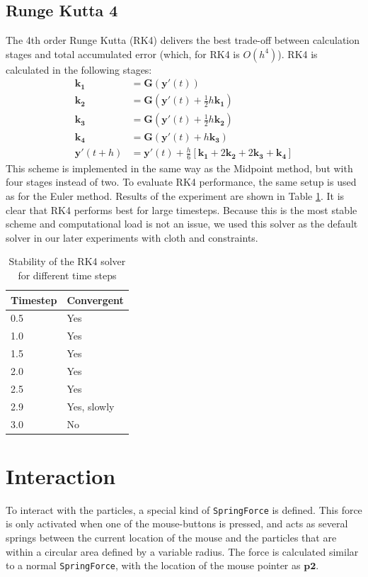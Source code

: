 \documentclass[a4paper,twoside,11pt,twocolumn]{article}
\begin{document}
\subsection{Runge Kutta 4}
The 4th order Runge Kutta (RK4) delivers the best trade-off between calculation stages and total accumulated error (which, for RK4 is $O(h^4)$). RK4 is calculated in the following stages:
\begin{align}
	\mathbf{k_1} &= \mathbf{G}(\mathbf{y}'(t))\\
	\mathbf{k_2} &= \mathbf{G}(\mathbf{y}'(t)+\frac{1}{2}h\mathbf{k_1})\\
	\mathbf{k_3} &= \mathbf{G}(\mathbf{y}'(t)+\frac{1}{2}h\mathbf{k_2})\\
	\mathbf{k_4} &= \mathbf{G}(\mathbf{y}'(t)+h\mathbf{k_3})\\
	\mathbf{y}'(t+h) &= \mathbf{y}'(t) + \frac{h}{6}[\mathbf{k_1}+2\mathbf{k_2}+2\mathbf{k_3}+\mathbf{k_4}]
\end{align}
This scheme is implemented in the same way as the Midpoint method, but with four stages instead of two.
To evaluate RK4 performance, the same setup is used as for the Euler method. Results of the experiment are shown in Table \ref{RK4}. It is clear that RK4 performs best for large timesteps. Because this is the most stable scheme and computational load is not an issue, we used this solver as the default solver in our later experiments with cloth and constraints.
\begin{table}[h]
	\caption{Stability of the RK4 solver for different time steps}
	\label{RK4}
	\begin{tabular}{|l|l|}
		\hline
		\textbf{Timestep} & \textbf{Convergent} \\ \hline
		0.5               & Yes                 \\ \hline
		1.0               & Yes                 \\ \hline
		1.5               & Yes                 \\ \hline
		2.0               & Yes                 \\ \hline
		2.5               & Yes                 \\ \hline
		2.9               & Yes, slowly         \\ \hline
		3.0               & No                  \\ \hline
	\end{tabular}
\end{table}

\section{Interaction}
To interact with the particles, a special kind of \texttt{SpringForce} is defined. This force is only activated when one of the mouse-buttons is pressed, and acts as several springs between the current location of the mouse and the particles that are within a circular area defined by a variable radius. The force is calculated similar to a normal \texttt{SpringForce}, with the location of the mouse pointer as $\mathbf{p2}$.
\end{document}
